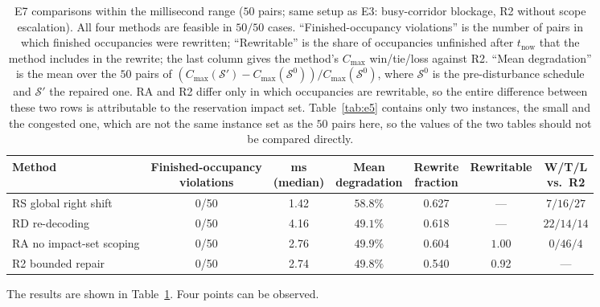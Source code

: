 \documentclass[manuscript,screen,review]{acmart}
\newcommand{\NPairs}{50}
\newcommand{\ClosureAliveFrac}{92\%}
\newcommand{\MsShift}{1.42}          %
\newcommand{\MsRedecode}{4.16}       %
\newcommand{\MsAllFuture}{2.76}      %
\newcommand{\MsCheapRtwo}{2.74}      %
\newcommand{\ShiftBad}{0/\NPairs}    %
\newcommand{\RedecodeBad}{0/\NPairs}
\newcommand{\ResFracCheapRtwo}{0.540}
\newcommand{\ResFracShift}{0.627}
\newcommand{\ResFracRedecode}{0.618}
\newcommand{\ResFracAllFuture}{0.604}
\newcommand{\ClosureShareMean}{0.92} %
\begin{document}
\begin{table}[t]
\centering
\caption{E7 comparisons within the millisecond range (\(\NPairs\) pairs; same setup as E3: busy-corridor blockage, R2 without scope escalation). All four methods are feasible in \(\NPairs/\NPairs\) cases.
``Finished-occupancy violations'' is the number of pairs in which finished occupancies were rewritten; ``Rewritable'' is the share of occupancies unfinished after \(t_{\mathrm{now}}\)
that the method includes in the rewrite; the last column gives the method's \(C_{\max}\) win/tie/loss against R2. ``Mean degradation'' is the mean over the \(\NPairs\) pairs of \((C_{\max}(\mathcal{S}')-C_{\max}(\mathcal{S}^0))/C_{\max}(\mathcal{S}^0)\), where \(\mathcal{S}^0\) is the pre-disturbance schedule and \(\mathcal{S}'\) the repaired one. RA and R2 differ only in which occupancies are rewritable,
so the entire difference between these two rows is attributable to the reservation impact set. Table~\ref{tab:e5} contains only two instances, the small and the congested one, which are not the same instance set as the \(\NPairs\) pairs here, so the values of the two tables should not be compared directly.}
\label{tab:cheap}
\small
\begin{tabular}{@{}lcccccc@{}}
\toprule
Method & \makecell{Finished-occupancy\\violations} & \makecell{ms\\(median)} & \makecell{Mean\\degradation} & \makecell{Rewrite\\fraction} & Rewritable & \makecell{W/T/L\\vs.\ R2} \\
\midrule
RS global right shift      & \ShiftBad     & \MsShift    & \(58.8\%\) & \ResFracShift    & ---   & \(7/16/27\) \\
RD re-decoding        & \RedecodeBad  & \MsRedecode & \(49.1\%\) & \ResFracRedecode & ---   & \(22/14/14\) \\
RA no impact-set scoping & \ShiftBad     & \MsAllFuture & \(49.9\%\) & \ResFracAllFuture & \(1.00\) & \(0/46/4\) \\
R2 bounded repair      & \ShiftBad     & \MsCheapRtwo & \(49.8\%\) & \ResFracCheapRtwo & \ClosureShareMean & --- \\
\bottomrule
\end{tabular}
\end{table}

The results are shown in Table~\ref{tab:cheap}. Four points can be observed.
\end{document}
